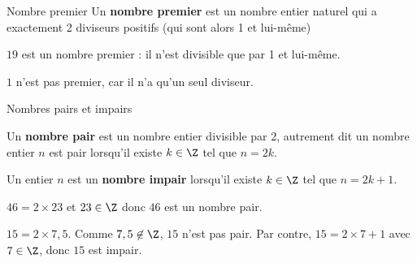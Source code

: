 \begin{pageCours}
\begin{DefT}{Nombre premier}
Un \textbf{nombre premier} est un nombre entier naturel qui a exactement 2 diviseurs positifs (qui sont alors 1 et lui-même) 

\end{DefT}


\begin{Ex} 

  $19$ est un nombre premier :  il n'est divisible que par 1 et lui-même.

  $1$ n'est pas premier, car il n'a qu'un seul diviseur.  
\end{Ex}

\begin{DefT}{Nombres pairs et impairs}

  Un \textbf{nombre pair} est un nombre entier divisible par 2, autrement
  dit un nombre entier $n$ est pair lorsqu'il existe $k \in \Z$
  tel que $n=2k$.

  Un entier $n$ est un \textbf{nombre impair} lorsqu'il existe $k \in \Z$
  tel que $n=2k+1$.
\end{DefT}


\begin{Exs} 
$46 = 2 \times 23$ et $23\in\Z$ donc $46$ est un nombre pair.

  $15= 2 \times 7,5$. Comme $7,5 \not\in\Z$, $15$ n'est pas pair. Par contre,
  $15=2 \times 7+1$ avec $7 \in \Z$, donc $15$ est impair.
\end{Exs}


\end{pageCours} 
